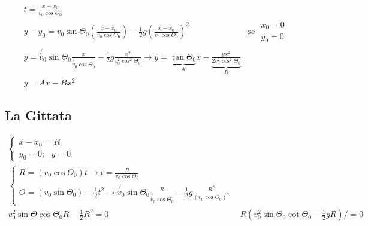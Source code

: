 \documentclass{article}
\begin{document}
\begin{eqnarray}
  \label{eq:eqtrai}
  t=\frac{x-x_0}{v_0\cos\Theta_0}\\
  y-y_0=v_0\sin\Theta_0\left(\frac{x-x_0}{v_0\cos\Theta_0}\right)-\frac{1}{2}g\left(\frac{x-x_0}{v_0\cos\Theta_0}\right)^2& \text{se }
                                                                                                                            \begin{matrix}
                                                                                                                              x_0=0\\
                     y_0=0
                                                                                                                            \end{matrix}\\
  y=\not{v_0}\sin\Theta_0\frac{x}{\not{v_0}\cos\Theta_0}-\frac{1}{2}g\frac{x^2}{v^2_0\cos^2\Theta_0}\to y=\underbrace{\tan\Theta_0}_Ax-\underbrace{\frac{gx^2}{2v_0^2\cos^2\Theta{}_0}}_B\\
  y=Ax-Bx^2
\end{eqnarray}

\subsection{La Gittata}
\label{sec:gittata}

\begin{eqnarray}
  \label{eq:gittata}
  \begin{cases}
    x-x_0=R\\
    y_0=0;\text{ }y=0
  \end{cases}\\
  \begin{cases}
    R=(v_0\cos\Theta_0)t\to t =\frac{R}{v_0\cos\Theta{}_0}\\
    O=(v_0\sin\Theta{}_0)-\frac{1}{2}t^2\to \not{v_0}\sin\Theta_0\frac{R}{\not{v_0}\cos\Theta_0}-\frac{1}{2}g\frac{R^2}{(v_0\cos\Theta_0)^2}
  \end{cases}\\
  v_0^2\sin\Theta{}\cos\Theta{}_0R-\frac{1}{2}R^2=0 & R(v_0^2\sin\Theta{}_0\cot\Theta{}_0-\frac{1}{2}gR)/=0
\end{eqnarray}
\end{document}
